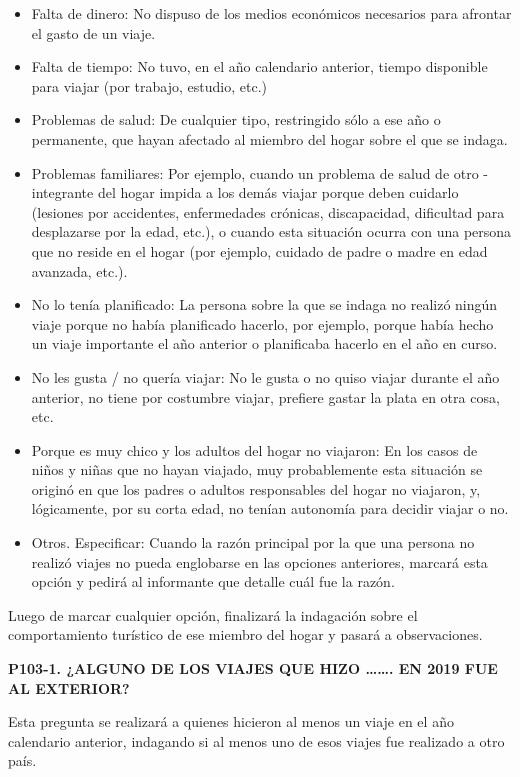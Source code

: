 \documentclass[
  openany]{book}
\begin{document}
\begin{itemize}
\item
  Falta de dinero: No dispuso de los medios económicos necesarios para afrontar el gasto de un viaje.
\item
  Falta de tiempo: No tuvo, en el año calendario anterior, tiempo disponible para viajar (por trabajo, estudio, etc.)
\item
  Problemas de salud: De cualquier tipo, restringido sólo a ese año o permanente, que hayan afectado al miembro del hogar sobre el que se indaga.
\item
  Problemas familiares: Por ejemplo, cuando un problema de salud de otro -integrante del hogar impida a los demás viajar porque deben cuidarlo (lesiones por accidentes, enfermedades crónicas, discapacidad, dificultad para desplazarse por la edad, etc.), o cuando esta situación ocurra con una persona que no reside en el hogar (por ejemplo, cuidado de padre o madre en edad avanzada, etc.).
\item
  No lo tenía planificado: La persona sobre la que se indaga no realizó ningún viaje porque no había planificado hacerlo, por ejemplo, porque había hecho un viaje importante el año anterior o planificaba hacerlo en el año en curso.
\item
  No les gusta / no quería viajar: No le gusta o no quiso viajar durante el año anterior, no tiene por costumbre viajar, prefiere gastar la plata en otra cosa, etc.
\item
  Porque es muy chico y los adultos del hogar no viajaron: En los casos de niños y niñas que no hayan viajado, muy probablemente esta situación se originó en que los padres o adultos responsables del hogar no viajaron, y, lógicamente, por su corta edad, no tenían autonomía para decidir viajar o no.
\item
  Otros. Especificar: Cuando la razón principal por la que una persona no realizó viajes no pueda englobarse en las opciones anteriores, marcará esta opción y pedirá al informante que detalle cuál fue la razón.
\end{itemize}

Luego de marcar cualquier opción, finalizará la indagación sobre el comportamiento turístico de ese miembro del hogar y pasará a observaciones.

\textbf{P103-1. ¿ALGUNO DE LOS VIAJES QUE HIZO \ldots\ldots. EN 2019 FUE AL EXTERIOR?}

Esta pregunta se realizará a quienes hicieron al menos un viaje en el año calendario anterior, indagando si al menos uno de esos viajes fue realizado a otro país.
\end{document}
